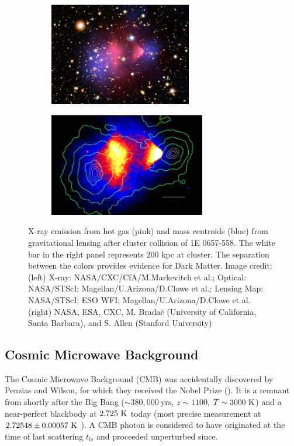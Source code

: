 \begin{figure}[t!]
    \centering
    \begin{subfigure}[t]{0.45\textwidth}
        \centering
        \includegraphics[height=4.5cm]{chandra_bullett_preview}
    \end{subfigure}%
    \begin{subfigure}[t]{0.45\textwidth}
        \centering
        \includegraphics[height=4.5cm]{bullet_cluster_paper}
    \end{subfigure}
    \caption{X-ray emission from hot gas (pink) and mass centroids (blue) from gravitational lensing after cluster
	collision of 1E 0657-558.  The white bar in the right panel represents 200 kpc at cluster.  The separation
	between the colors provides evidence for Dark Matter.
	Image credit: (left) X-ray: NASA/CXC/CfA/M.Markevitch et al.; Optical: NASA/STScI; Magellan/U.Arizona/D.Clowe et al.;
	Lensing Map: NASA/STScI; ESO WFI; Magellan/U.Arizona/D.Clowe et al. (right) NASA, ESA, CXC, M. Brada\u{c}
	(University of California, Santa Barbara), and S. Allen (Stanford University)}
	\label{fig:bullet_cluster}
\end{figure}




\subsection{Cosmic Microwave Background} \label{subsec:cmb}
The Cosmic Microwave Background (CMB) was accidentally discovered by Penzias and Wilson, for which they received
the Nobel Prize ().  It
is a remnant from shortly after the Big Bang ($\sim380,000\ \mathrm{yrs}$, $z\sim1100$, $T\sim3000\ \mathrm{K}$) and a near-perfect
blackbody at $2.725\ \mathrm{K}$ today (most precise measurement at $2.72548 \pm 0.00057\ \mathrm{K}$ ).  A CMB
photon is considered to have originated at the time of last scattering $t_{ls}$ and proceeded unperturbed since.

